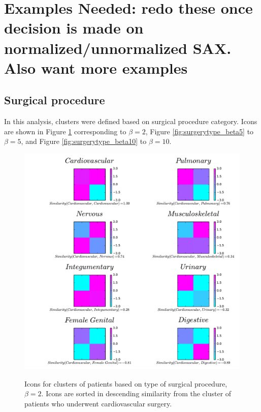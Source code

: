 \section{Examples \textbf{Needed: redo these once decision is made on normalized/unnormalized SAX. Also want more examples}}
\subsection{Surgical procedure}
In this analysis, clusters were defined based on surgical procedure category. Icons are shown in Figure \ref{fig:surgerytype_beta2} corresponding to $\beta=2$, Figure \ref{fig:surgerytype_beta5} to $\beta=5$, and Figure \ref{fig:surgerytype_beta10} to $\beta=10$.

\begin{figure}[h]
  \includegraphics[scale=0.4]{./Figures/surgerytype_beta2.pdf}\\
  \caption{Icons for clusters of patients based on type of surgical procedure, $\beta=2$. Icons are sorted in descending similarity from the cluster of patients who underwent cardiovascular surgery.}\label{fig:surgerytype_beta2}
\end{figure}

